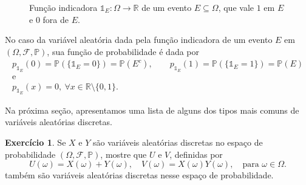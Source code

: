 \documentclass[12pt,portuguese]{article}
\theoremstyle{definition}
\newtheorem{exercise}{Exercício}
\begin{document}
\begin{figure}[H]
\centering
{}
\caption{Função indicadora $\mathds{1}_{E}:\Omega\to\mathbb{R}$ de um evento
$E\subseteq\Omega$, que vale $1$ em $E$ e $0$ fora de $E$.}
\label{fig:indicadora}
\end{figure}

No caso da variável aleatória dada pela função indicadora de um evento \(E\)
em \((\Omega,\mathcal{F},\mathbb{P})\), sua função de probabilidade é dada por
\begin{gather*}
p_{\mathds{1}_{E}}(0) = \mathbb{P}(\{ \mathds{1}_{E}=0 \}) = \mathbb{P}(E^c),
\qquad
p_{\mathds{1}_{E}}(1) = \mathbb{P}(\{ \mathds{1}_{E}=1 \}) = \mathbb{P}(E)
\\
\text{e}
\\
p_{\mathds{1}_{E}}(x) = 0, \ \forall x\in\mathbb{R}\setminus\{0,1\}.
\end{gather*}



Na próxima seção, apresentamos uma lista de alguns dos tipos mais comuns de
variáveis aleatórias discretas.

\begin{exercise}\label{exercise:soma-e-produto-de-va}
  Se \(X\) e \(Y\) são variáveis aleatórias discretas no espaço de
  probabilidade \((\Omega, \mathcal{F}, \mathbb{P})\), mostre que \(U\) e
  \(V\), definidas por
  \[
    U(\omega) = X(\omega) + Y(\omega), \quad V(\omega) = X(\omega)Y(\omega),
    \quad \text{para } \omega \in \Omega.
  \]
  também são variáveis aleatórias discretas nesse espaço de probabilidade.
\end{exercise}
\end{document}
